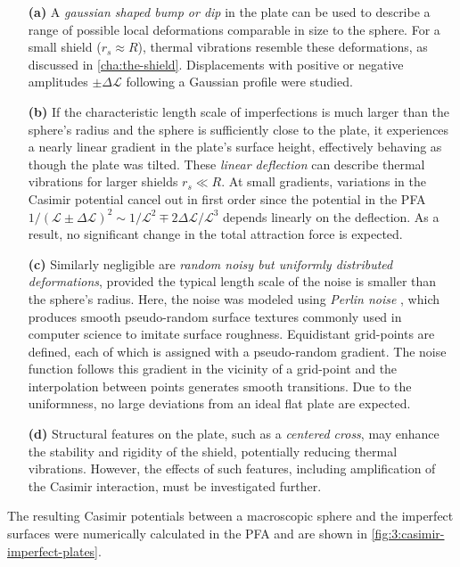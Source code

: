 \begin{enumerate}
  \item[\textbf{(a)}] A \textit{gaussian shaped bump or dip} in the plate can be used to describe a range of possible local deformations comparable in size to the sphere. 
  For a small shield ($r_s \approx R$), thermal vibrations resemble these deformations, as discussed in \cref{cha:the-shield}.
  Displacements with positive or negative amplitudes $\pm \Delta \mathscr{L}$ following a Gaussian profile were studied.

  \item[\textbf{(b)}] If the characteristic length scale of imperfections is much larger than the sphere's radius and the sphere is sufficiently close to the plate, it experiences a nearly linear gradient in the plate's surface height, effectively behaving as though the plate was tilted. These \textit{linear deflection} can describe thermal vibrations for larger shields $r_s \ll R$. At small gradients, variations in the Casimir potential cancel out in first order since the potential in the PFA $1/(\mathscr{L} \pm \Delta \mathscr{L})^2 \sim 1/\mathscr{L}^2 \mp 2\Delta \mathscr{L}/\mathscr{L}^3$ depends linearly on the deflection. As a result, no significant change in the total attraction force is expected.
  
  \item[\textbf{(c)}] Similarly negligible are \textit{random noisy but uniformly distributed deformations}, provided the typical length scale of the noise is smaller than the sphere's radius. Here, the noise was modeled using \textit{Perlin noise} \cite{Perlin_1985}, which produces smooth pseudo-random surface textures commonly used in computer science to imitate surface roughness. Equidistant grid-points are defined, each of which is assigned with a pseudo-random gradient. The noise function follows this gradient in the vicinity of a grid-point and the interpolation between points generates smooth transitions. Due to the uniformness, no large deviations from an ideal flat plate are expected.
  
  \item[\textbf{(d)}] Structural features on the plate, such as a \textit{centered cross}, may enhance the stability and rigidity of the shield, potentially reducing thermal vibrations. However, the effects of such features, including amplification of the Casimir interaction, must be investigated further.
\end{enumerate}
The resulting Casimir potentials between a macroscopic sphere and the imperfect surfaces were numerically calculated in the PFA and are shown in \cref{fig:3:casimir-imperfect-plates}.
